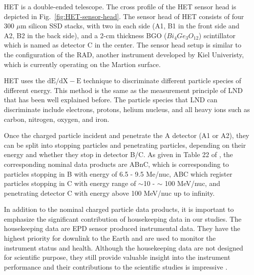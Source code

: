 \ac{HET} is a double-ended telescope. The cross profile of the \ac{HET} sensor head is depicted in Fig.~\ref{fig:HET-sensor-head}. The sensor head of \ac{HET} consists of four 300 $\mu$m silicon \ac{SSD} stacks, with two in each side (A1, B1 in the front side and A2, B2 in the back side), and a 2-cm thickness \ac{BGO} ($Bi_{4}Ge_{3}O_{12}$) scintillator which is named as detector C in the center. The sensor head setup is similar to the configuration of the \ac{RAD}, another instrument developed by Kiel Univeristy, which is currently operating on the Martion surface.  

\ac{HET} uses the $\mathrm{dE/dX - E}$ technique to discriminate different particle species of different energy. This method is the same as the measurement principle of \ac{LND} that has been well explained before. The particle species that \ac{LND} can discriminate include electrons, protons, helium nucleus, and all heavy ions such as carbon, nitrogen, oxygen, and iron.  

Once the charged particle incident and penetrate the A detector (A1 or A2), they can be split into stopping particles and penetrating particles, depending on their energy and whether they stop in detector B/C. As given in Table 22 of \citet{RodriguezPacheco-2019-EPD}, the corresponding nominal data products are ABnC, which is corresponding to particles stopping in B with energy of 6.5 - 9.5 Me/nuc, ABC which register particles stopping in C with energy range of $\sim$10 - $\sim$ 100 MeV/nuc, and penetrating detector C with energy above 100 MeV/nuc up to infinity. 



In addition to the nominal charged particle data products, it is important to emphasize the significant contribution of housekeeping data in our studies.
The housekeeping data are \ac{EPD} sensor produced instrumental data. They have the highest priority for downlink to the Earth and are used to monitor the instrument status and health. Although the housekeeping data are not designed for scientific purpose, they still provide valuable insight into the instrument performance and their contributions to the scientific studies is impressive \citep{Wimmer2021AA}.


